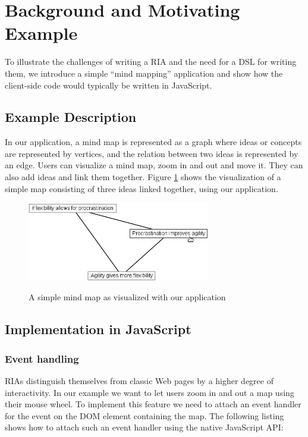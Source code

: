 \documentclass[american,english,runningheads]{llncs}
\begin{document}
\section{Background and Motivating Example}
\label{problem}

To illustrate the challenges of writing a RIA and the need for a DSL for writing them, we introduce a simple “mind
mapping” application and show how the client-side code would typically be written in JavaScript.

\subsection{Example Description}

In our application, a mind map is represented as a graph where ideas or concepts are represented by vertices, and the
relation between two ideas is represented by an edge. Users can visualize a mind map, zoom in and out and move it.
They can also add ideas and link them together. Figure \ref{mindmap} shows the visualization of a simple map
consisting of three ideas linked together, using our application.

\begin{figure}
 \caption{A simple mind map as visualized with our application}
 \centering
 \includegraphics[width=8cm]{mindmap.png}
 \label{mindmap}
\end{figure}

\subsection{Implementation in JavaScript}

\subsubsection{Event handling}

RIAs distinguish themselves from classic Web pages by a higher degree of interactivity. In our example we want to let users zoom
in and out a map using their mouse wheel. To implement this feature we need to attach an event handler for the
 event on the DOM element containing the map. The following listing shows how to attach such an
event handler using the native JavaScript API:
\end{document}
